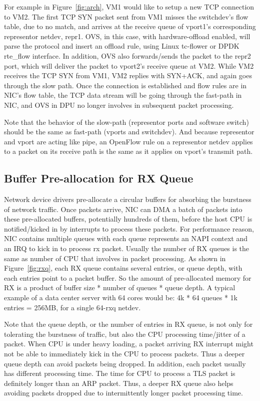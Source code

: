 \documentclass[letterpaper]{article}
\begin{document}
For example in Figure~\ref{fig:arch}, VM1 would like to setup a new TCP
connection to VM2. The first TCP SYN packet sent from VM1 misses the
switchdev's flow table, due to no match, and arrives at the receive
queue of vport1's corresponding representor netdev, repr1.
OVS, in this case, with hardware-offload enabled, will parse the protocol
and insert an offload rule, using Linux tc-flower or DPDK rte\_flow interface.
In addition, OVS also forwards/sends the packet to the repr2 port, which
will deliver the packet to vport2's receive queue at VM2.
While VM2 receives the TCP SYN from VM1, VM2 replies with SYN+ACK, and
again goes through the slow path. Once the connection is established
and flow rules are in NIC's flow table, the TCP data stream will be
going through the fast-path in NIC, and OVS in DPU no longer involves
in subsequent packet processing.

Note that the behavior of the slow-path (representor ports and software
switch) should be the same as fast-path (vports and switchdev).
And because representor and vport are acting like pipe, an OpenFlow
rule on a representor netdev applies to a packet on its
receive path is the same as it applies on vport's transmit path.


\subsection{Buffer Pre-allocation for RX Queue}
Network device drivers pre-allocate a circular buffers for absorbing the
burstness of network traffic.
Once packets arrive, NIC can DMA a batch of packets into these pre-allocated buffers,
potentially hundreds of them, before the host CPU is notified/kicked in
by interrupts to process these packets.
For performance reason, NIC contains multiple queues with each queue
represents an NAPI context and an IRQ to kick in to process rx packet.
Usually the number of RX queues is the same as number of CPU that involves
in packet processing.
As shown in Figure~\ref{fig:rxq}, each RX queue contains several entries, 
or queue depth, with each entries
point to a packet buffer. So the amount of pre-allocated memory for RX
is a product of buffer size * number of queues * queue depth.
A typical example of a data center server with 64 cores would be:
4k * 64 queues * 1k entries = 256MB, for a single 64-rxq netdev.

Note that the queue depth, or the number of entries in RX queue, is
not only for tolerating the burstness of traffic, but also the CPU
processing time/jitter of a packet. When CPU is under heavy loading,
a packet arriving RX interrupt might not be able to immediately
kick in the CPU to process packets. Thus a deeper queue depth can
avoid packets being dropped.
In addition, each packet usually has different processing time.
The time for CPU to process a TLS packet is definitely longer than
an ARP packet. Thus, a deeper RX queue also helps avoiding packets
dropped due to intermittently longer packet processing time.
\end{document}
